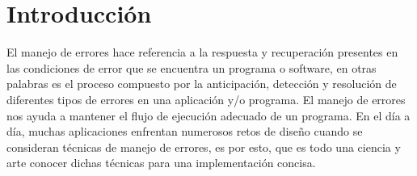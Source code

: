 \documentclass{dense_template}
\begin{document}
\maketitle
\tableofcontents
\newpage
\section{Introducción}
El manejo de errores hace referencia a la respuesta y recuperación presentes en las condiciones de error que se encuentra un programa o software, en otras palabras es el proceso compuesto por la anticipación, detección y resolución de diferentes tipos de errores en una aplicación y/o programa. El manejo de errores nos ayuda a mantener el flujo de ejecución adecuado de un programa. En el día a día, muchas aplicaciones enfrentan numerosos retos de diseño cuando se consideran técnicas de manejo de errores, es por esto, que es todo una ciencia y arte conocer dichas técnicas para una implementación concisa.  
\end{document}
